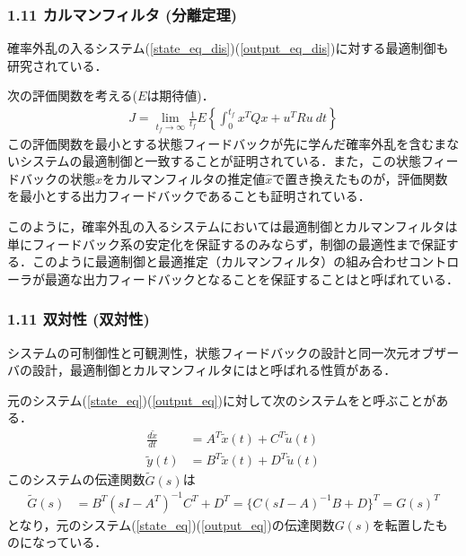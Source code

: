 \begin{frame}[t]
\frametitle{1.11 カルマンフィルタ (分離定理)}
確率外乱の入るシステム(\ref{state_eq_dis})(\ref{output_eq_dis})に対する最適制御も研究されている．

次の評価関数を考える($E$は期待値)．
\begin{align}
  J=\lim_{t_f \rightarrow \infty} \frac{1}{t_f} E \left\{\int_0^{t_f} x^T Q x + u^T R u \ dt \right\}
\end{align}
この評価関数を最小とする状態フィードバックが先に学んだ確率外乱を含むまないシステムの最適制御と一致することが証明されている．また，この状態フィードバックの状態$x$をカルマンフィルタの推定値$\hat{x}$で置き換えたものが，評価関数を最小とする出力フィードバックであることも証明されている．

このように，確率外乱の入るシステムにおいては最適制御とカルマンフィルタは単にフィードバック系の安定化を保証するのみならず，制御の最適性まで保証する．このように最適制御と最適推定（カルマンフィルタ）の組み合わせコントローラが最適な出力フィードバックとなることを保証することはと呼ばれている．
\end{frame}


\begin{frame}[t]
\frametitle{1.11 双対性 (双対性)}
システムの可制御性と可観測性，状態フィードバックの設計と同一次元オブザーバの設計，最適制御とカルマンフィルタにはと呼ばれる性質がある．

元のシステム(\ref{state_eq})(\ref{output_eq})に対して次のシステムをと呼ぶことがある．
\begin{align}
 \frac{d \tilde{x}}{dt} &= A^T \tilde{x}(t) + C^T \tilde{u}(t) \label{state_eq_dual} \\
 \tilde{y}(t) &= B^T \tilde{x}(t) + D^T \tilde{u}(t) \label{output_eq_dual}
\end{align}
このシステムの伝達関数$\tilde{G}(s)$は
\begin{align}
  \tilde{G}(s) &= B^T (sI-A^T)^{-1} C^T + D^T = \{C(sI-A)^{-1}B + D\}^T = G(s)^T
\end{align}
となり，元のシステム(\ref{state_eq})(\ref{output_eq})の伝達関数$G(s)$を転置したものになっている．

\end{frame}



